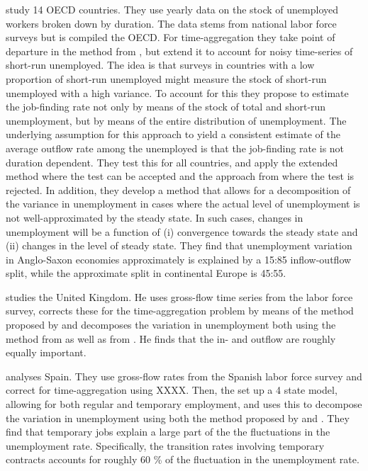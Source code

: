 \cite{Elsby2013} study 14 OECD countries. They use yearly data on the stock of unemployed workers broken down by duration. The data stems from national labor force surveys but is compiled the OECD. For time-aggregation they take point of departure in the method  from \cite{Shimer2012}, but extend it to account for noisy time-series of short-run unemployed. The idea is that surveys in countries with a low proportion of short-run unemployed might measure the stock of short-run unemployed with a high variance. To account for this they propose to estimate the job-finding rate not only by means of the stock of total and short-run unemployment, but by means of the entire distribution of unemployment. The underlying assumption for this approach to yield a consistent estimate of the average outflow rate among the unemployed is that the job-finding rate is not duration dependent. They test this for all countries, and apply the extended method where the test can be accepted and the approach from \cite{Shimer2012} where the test is rejected. In addition, they develop a method that allows for a decomposition of the variance in unemployment in cases where the actual level of unemployment is not well-approximated by the steady state. In such cases, changes in unemployment will be a function of (i) convergence towards the steady state and (ii) changes in the level of steady state. They find that unemployment variation in Anglo-Saxon economies approximately is explained by a 15:85 inflow-outflow split, while the approximate split in continental Europe is 45:55.

\cite{Gomes2012} studies the United Kingdom. He uses gross-flow time series from the labor force survey, corrects these for the time-aggregation problem by means of the method proposed by \cite{Shimer2012} and decomposes the variation in unemployment both using the method from \cite{Shimer2012} as well as from \cite{Fujita2008}. He finds that the in- and outflow are roughly equally important. 

\cite{Silva2013} analyses Spain. They use gross-flow rates from the Spanish labor force survey and correct for time-aggregation using XXXX. Then, the set up a 4 state model, allowing for both regular and temporary employment, and uses this to decompose the variation in unemployment using both the method proposed by \cite{Shimer2012} and \cite{Fujita2009}. They find that temporary jobs explain a large part of the the fluctuations in the unemployment rate. Specifically, the transition rates involving temporary contracts accounts for roughly 60 \% of the fluctuation in the unemployment rate.

